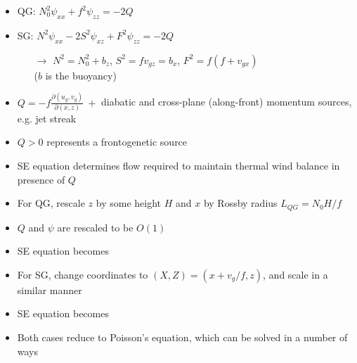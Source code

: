 \documentclass[landscape]{seminar}
\begin{document}
\begin{slide}

\begin{itemize}
\item QG: \quad $\! N_{\scriptscriptstyle 0}^2 \psi_{xx} + f^2 \psi_{zz} = -2 Q$

\item SG: \quad $N^2 \psi_{xx} - 2 S^2 \psi_{xz} + F^2 \psi_{zz} = -2 Q$

\vskip 10pt
\begin{itemize}
\item[$\rightarrow$]{\small $N^2 = N_{\scriptscriptstyle 0}^2 + b_z$, $S^2 = f v_{gz} = b_{x}$, $F^2 = f(f+v_{gx})$ \\ ($b$ is the buoyancy)}
\end{itemize}
\vskip 10pt

\item $Q = - f \frac{\partial(u_g,v_g)}{\partial(x,z)} \ + $ diabatic and cross-plane (along-front) momentum sources, e.g. jet streak

\item $Q > 0$ represents a frontogenetic source

\item SE equation determines flow required to maintain thermal wind balance in presence of $Q$
\end{itemize}

\end{slide}
\begin{slide}

\begin{itemize}
\item For QG, rescale $z$ by some height $H$ and $x$ by Rossby radius $L_{QG} = N_{\scriptscriptstyle 0}H/f$

\item $Q$ and $\psi$ are rescaled to be $O(1)$

\item SE equation becomes 

\item For SG, change coordinates to $(X,Z) = (x+v_g/f,z)$, and scale in a similar manner

\item SE equation becomes 

\item Both cases reduce to Poisson's equation, which can be solved in a number of ways
\end{itemize}

\end{slide}
\end{document}
